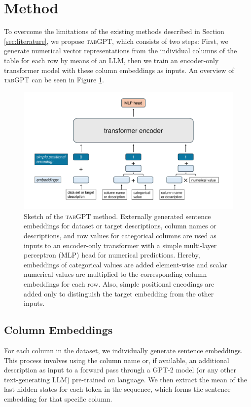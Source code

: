 \documentclass{article}
\begin{document}
\section{Method}
\label{sec:method}

To overcome the limitations of the existing methods described in Section \ref{sec:literature}, we propose \textsc{tabGPT}, which consists of two steps: First, we generate numerical vector representations from the individual columns of the table for each row by means of an LLM, then we train an encoder-only transformer model with these column embeddings as inputs. An overview of \textsc{tabGPT} can be seen in Figure \ref{fig:tabGPT}.

\begin{figure}[ht]
    \centering
    \includegraphics[width=0.95\linewidth]{tabgpt_diagram.pdf}
    \caption{Sketch of the \textsc{tabGPT} method. Externally generated sentence embeddings for dataset or target descriptions, column names or descriptions, and row values for categorical columns are used as inputs to an encoder-only transformer with a simple multi-layer perceptron (MLP) head for numerical predictions. Hereby, embeddings of categorical values are added element-wise and scalar numerical values are multiplied to the corresponding column embeddings for each row. Also, simple positional encodings are added only to distinguish the target embedding from the other inputs.}
    \label{fig:tabGPT}
\end{figure}

\subsection{Column Embeddings}
For each column in the dataset, we individually generate sentence embeddings. This process involves using the column name or, if available, an additional description as input to a forward pass through a \textsc{GPT-2} model (or any other text-generating LLM) pre-trained on language. We then extract the mean of the last hidden states for each token in the sequence, which forms the sentence embedding for that specific column.
\end{document}
